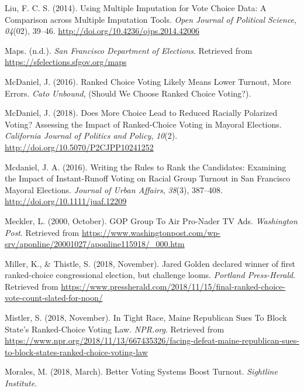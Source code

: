 \documentclass[12pt,twoside]{reedthesis}
\begin{document}
\leavevmode\hypertarget{ref-liu_using_2014}{}%
Liu, F. C. S. (2014). Using Multiple Imputation for Vote Choice Data: A Comparison across Multiple Imputation Tools. \emph{Open Journal of Political Science}, \emph{04}(02), 39--46. \url{http://doi.org/10.4236/ojps.2014.42006}

\leavevmode\hypertarget{ref-noauthor_maps_nodate}{}%
Maps. (n.d.). \emph{San Francisco Department of Elections}. Retrieved from \url{https://sfelections.sfgov.org/maps}

\leavevmode\hypertarget{ref-mcdaniel_ranked_2016}{}%
McDaniel, J. (2016). Ranked Choice Voting Likely Means Lower Turnout, More Errors. \emph{Cato Unbound}, (Should We Choose Ranked Choice Voting?).

\leavevmode\hypertarget{ref-mcdaniel_does_2018}{}%
McDaniel, J. (2018). Does More Choice Lead to Reduced Racially Polarized Voting? Assessing the Impact of Ranked-Choice Voting in Mayoral Elections. \emph{California Journal of Politics and Policy}, \emph{10}(2). \url{http://doi.org/10.5070/P2CJPP10241252}

\leavevmode\hypertarget{ref-mcdaniel_writing_2016}{}%
Mcdaniel, J. A. (2016). Writing the Rules to Rank the Candidates: Examining the Impact of Instant-Runoff Voting on Racial Group Turnout in San Francisco Mayoral Elections. \emph{Journal of Urban Affairs}, \emph{38}(3), 387--408. \url{http://doi.org/10.1111/juaf.12209}

\leavevmode\hypertarget{ref-meckler_gop_2000}{}%
Meckler, L. (2000, October). GOP Group To Air Pro-Nader TV Ads. \emph{Washington Post}. Retrieved from \url{https://www.washingtonpost.com/wp-srv/aponline/20001027/aponline115918/_000.htm}

\leavevmode\hypertarget{ref-miller_jared_2018}{}%
Miller, K., \& Thistle, S. (2018, November). Jared Golden declared winner of first ranked-choice congressional election, but challenge looms. \emph{Portland Press-Herald}. Retrieved from \url{https://www.pressherald.com/2018/11/15/final-ranked-choice-vote-count-slated-for-noon/}

\leavevmode\hypertarget{ref-mistler_tight_2018}{}%
Mistler, S. (2018, November). In Tight Race, Maine Republican Sues To Block State's Ranked-Choice Voting Law. \emph{NPR.org}. Retrieved from \url{https://www.npr.org/2018/11/13/667435326/facing-defeat-maine-republican-sues-to-block-states-ranked-choice-voting-law}

\leavevmode\hypertarget{ref-morales_better_2018}{}%
Morales, M. (2018, March). Better Voting Systems Boost Turnout. \emph{Sightline Institute}.
\end{document}
